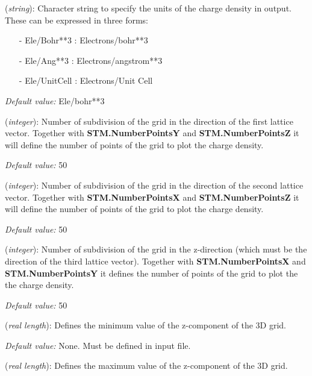 \begin{description}
\itemsep 10pt
\parsep 0pt

\item[{\bf STM.DensityUnits}] ({\it string}): 
Character string to specify the units of the charge density in output. 
These can be expressed in three forms:

\begin{itemize}
\item[-] Ele/Bohr**3      : Electrons/bohr**3
\item[-] Ele/Ang**3       : Electrons/angstrom**3
\item[-] Ele/UnitCell     : Electrons/Unit Cell 
\end{itemize}

{\it Default value:} Ele/bohr**3

\item[{\bf STM.NumberPointsX}] ({\it integer}):
 Number of subdivision of the grid in the direction of the 
 first lattice vector. Together
 with {\bf STM.NumberPointsY} and {\bf STM.NumberPointsZ}
 it will define the 
 number of points of the grid to plot the charge density.

{\it Default value:} 50

\item[{\bf STM.NumberPointsY}] ({\it integer}):
 Number of subdivision of the grid in the direction
 of the second lattice vector. Together
 with {\bf STM.NumberPointsX} and {\bf STM.NumberPointsZ}
 it will define the 
 number of points of the grid to plot the charge density.

{\it Default value:} 50

\item[{\bf STM.NumberPointsZ}] ({\it integer}):
 Number of subdivision of the grid in the z-direction (which must be the
 direction of the third lattice vector). Together
 with {\bf STM.NumberPointsX} and {\bf STM.NumberPointsY}
 it defines the 
 number of points of the grid to plot the the charge density.

{\it Default value:} 50


\item[{\bf STM.MinZ}] ({\it real length}):
 Defines the minimum value of the z-component of the 3D grid.

 {\it Default value:} None. Must be defined in input file.


\item[{\bf STM.MaxZ}] ({\it real length}):
 Defines the maximum value of the z-component of the 3D grid.


\end{description}
